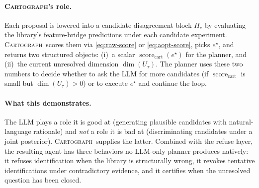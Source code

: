 \documentclass{article}
\newcommand{\method}{\textsc{Cartograph}}
\newcommand{\scorecart}{\operatorname{score}_{\mathrm{cart}}}
\theoremstyle{plain}
\theoremstyle{definition}
\theoremstyle{remark}
\begin{document}
\paragraph{\method's role.}
Each proposal is lowered into a candidate disagreement block $H_e$ by
evaluating the library's feature-bridge predictions under each candidate
experiment. \method\ scores them via \eqref{eq:raw-score} or
\eqref{eq:aopt-score}, picks $e^\star$, and returns two structured
objects: (i)~a scalar $\scorecart(e^\star)$ for the planner, and (ii)~the
current unresolved dimension $\dim(U_\tau)$. The planner uses these two
numbers to decide whether to ask the LLM for more candidates (if
$\scorecart$ is small but $\dim(U_\tau)>0$) or to execute $e^\star$ and
continue the loop.

\paragraph{What this demonstrates.}
The LLM plays a role it is good at (generating plausible candidates with
natural-language rationale) and \emph{not} a role it is bad at
(discriminating candidates under a joint posterior). \method\ supplies the
latter. Combined with the refuse layer, the resulting agent has three
behaviors no LLM-only planner produces natively: it refuses identification
when the library is structurally wrong, it revokes tentative
identifications under contradictory evidence, and it certifies when the
unresolved question has been closed.
\end{document}
